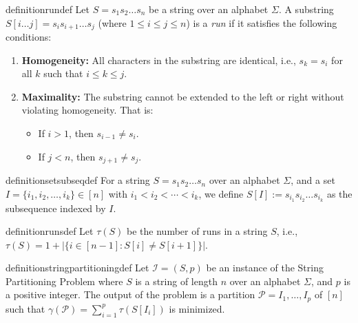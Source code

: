 \begin{restatable}[Run]{definition}{rundef}
    \label{def:run}
    Let $S = s_1s_2\ldots s_n$ be a string over an alphabet $\Sigma$. A substring $S[i \dots j] = s_i s_{i+1} \ldots s_j$ (where $1 \le i \le j \le n$) is a \textit{run} if it satisfies the following conditions:
    \begin{enumerate}
        \item \textbf{Homogeneity:} All characters in the substring are identical, i.e., $s_k = s_i$ for all $k$ such that $i \le k \le j$.
        \item \textbf{Maximality:} The substring cannot be extended to the left or right without violating homogeneity. That is:
        \begin{itemize}
            \item If $i > 1$, then $s_{i-1} \neq s_i$.
            \item If $j < n$, then $s_{j+1} \neq s_j$.
        \end{itemize}
    \end{enumerate}
\end{restatable}

\begin{restatable}{definition}{setsubseqdef}
    For a string $S = s_1s_2\ldots s_n$ over an alphabet $\Sigma$, and a set $I=\{i_1, i_2, \ldots, i_k\} \in [n]$ with $i_1 < i_2 < \cdots < i_k$, we define $S[I] := s_{i_1} s_{i_2} \ldots s_{i_k}$ as the subsequence indexed by $I$.
\end{restatable}

\begin{restatable}{definition}{runsdef}
    Let $\tau(S)$ be the number of runs in a string $S$, i.e., $\tau(S) = 1 + |\{i \in [n-1]:S[i] \neq S[i+1]\}|$.
\end{restatable}

\begin{restatable}{definition}{stringpartitioningdef} \label{def:string_partitioning_problem}
    Let $\mathcal{I} = (S, p)$ be an instance of the String Partitioning Problem where $S$ is a string of length $n$ over an alphabet $\Sigma$, and $p$ is a positive integer. The output of the problem is a partition $\mathcal{P} = I_1,\dots,I_p$ of $[n]$ such that $\gamma(\mathcal{P}) = \sum_{i=1}^p \tau(S[I_i])$ is minimized.
\end{restatable}

